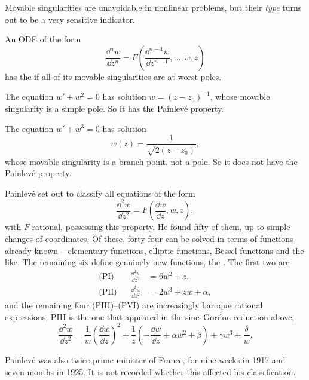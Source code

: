 \documentclass[a4paper]{scrartcl}
\begin{document}
Movable singularities are unavoidable in nonlinear problems, but their \emph{type} turns out to be a very sensitive indicator.

\begin{definition}
	An ODE of the form
	$$
	\frac{\dd^nw}{\dd z^n} = F\left(\frac{\dd^{n-1}w}{\dd z^{n-1}},\dots,w,z\right)
	$$
	has the  if all of its movable singularities are at worst poles.
\end{definition}

\begin{example}
	The equation $w' + w^2 = 0$ has solution $w = (z-z_0)^{-1}$, whose movable singularity is a simple pole. So it has the Painlev\'e property.
\end{example}

\begin{example}
	The equation $w' + w^3 = 0$ has solution
	$$
	w(z) = \frac{1}{\sqrt{2(z-z_0)}},
	$$
	whose movable singularity is a branch point, not a pole. So it does not have the Painlev\'e property.
\end{example}

Painlev\'e set out to classify all equations of the form
$$
\frac{\dd^2w}{\dd z^2} = F\left(\frac{\dd w}{\dd z}, w, z\right),
$$
with $F$ rational, possessing this property. He found fifty of them, up to simple changes of coordinates. Of these, forty-four can be solved in terms of functions already known -- elementary functions, elliptic functions, Bessel functions and the like. The remaining six define genuinely new functions, the . The first two are
\begin{align*}
	\text{(PI)}&& \frac{\dd^2w}{\dd z^2} &= 6w^2 + z,\\
	\text{(PII)}&& \frac{\dd^2w}{\dd z^2} &= 2w^3 + zw + \alpha,
\end{align*}
and the remaining four (PIII)--(PVI) are increasingly baroque rational expressions; PIII is the one that appeared in the sine--Gordon reduction above,
$$
\frac{\dd^2w}{\dd z^2} = \frac1w\left(\frac{\dd w}{\dd z}\right)^2 + \frac1z\left(-\frac{\dd w}{\dd z} + \alpha w^2 + \beta\right) + \gamma w^3 + \frac\delta w.
$$

\begin{remark}
	Painlev\'e was also twice prime minister of France, for nine weeks in 1917 and seven months in 1925. It is not recorded whether this affected his classification.
\end{remark}
\end{document}
